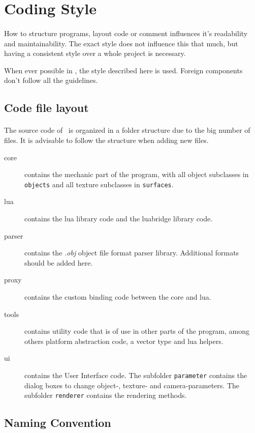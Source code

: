 \section{Coding Style\label{Style}}
\paragraph{}
How to structure programs, layout code or comment influences it's readability and maintainability.
The exact style does not influence this that much, but having a consistent style over a whole project is necessary.

When ever possible in \ER, the style described here is used.
Foreign components don't follow all the guidelines.

\subsection{Code file layout}
\paragraph{}
The source code of \ER\ is organized in a folder structure due to the big number of files.
It is advisable to follow the structure when adding new files.

\begin{description}
\item[{core}] contains the mechanic part of the program, with all object subclasses in \texttt{objects} and all texture subclasses in \texttt{surfaces}.
\item[{lua}] contains the lua library code and the luabridge library code.
\item[{parser}] contains the \textit{.obj} object file format parser library.
Additional formats should be added here.
\item[{proxy}] contains the custom binding code between the core and lua.
\item[{tools}] contains utility code that is of use in other parts of the program, among others platform abstraction code, a vector type and lua helpers.
\item[{ui}] contains the User Interface code.
The subfolder \texttt{parameter} contains the dialog boxes to change object-, texture- and camera-parameters.
The subfolder \texttt{renderer} contains the rendering methods.
\end{description}

\subsection{Naming Convention}
